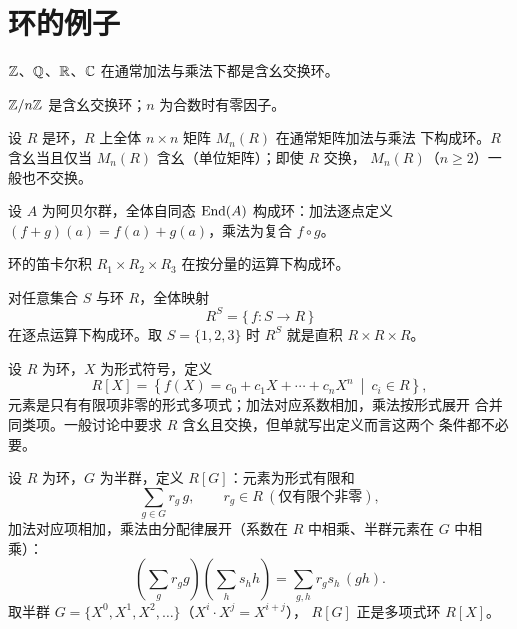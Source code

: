 \section{环的例子}\label{sec:ring-examples}

\begin{example}[数环]
$\mathbb{Z}$、$\mathbb{Q}$、$\mathbb{R}$、$\mathbb{C}$ 在通常加法与乘法下都是含幺交换环。
\end{example}

\begin{example}[模 $n$ 剩余类环]
$\mathbb{Z}/n\mathbb{Z}$ 是含幺交换环；$n$ 为合数时有零因子。
\end{example}

\begin{example}[矩阵环]
设 $R$ 是环，$R$ 上全体 $n\times n$ 矩阵 $M_n(R)$ 在通常矩阵加法与乘法
下构成环。$R$ 含幺当且仅当 $M_n(R)$ 含幺（单位矩阵）；即使 $R$ 交换，
$M_n(R)$（$n\ge 2$）一般也不交换。
\end{example}

\begin{example}[自同态环]
设 $A$ 为阿贝尔群，全体自同态 $\mathrm{End}(A)$ 构成环：加法逐点定义
$(f+g)(a) = f(a)+g(a)$，乘法为复合 $f\circ g$。
\end{example}

\begin{example}[直积]
环的笛卡尔积 $R_1\times R_2\times R_3$ 在按分量的运算下构成环。
\end{example}

\begin{example}[函数环]
对任意集合 $S$ 与环 $R$，全体映射
\[
  R^S = \{\,f\colon S\to R\,\}
\]
在逐点运算下构成环。取 $S = \{1,2,3\}$ 时 $R^S$ 就是直积
$R\times R\times R$。
\end{example}

\begin{example}[多项式环]
设 $R$ 为环，$X$ 为形式符号，定义
\[
  R[X] = \left\{ f(X) = c_0 + c_1 X + \cdots + c_n X^n
    \ \middle|\ c_i\in R \right\},
\]
元素是只有有限项非零的形式多项式；加法对应系数相加，乘法按形式展开
合并同类项。一般讨论中要求 $R$ 含幺且交换，但单就写出定义而言这两个
条件都不必要。
\end{example}

\begin{example}[群环 / 半群环]
设 $R$ 为环，$G$ 为半群，定义 $R[G]$：元素为形式有限和
\[
  \sum_{g\in G} r_g\, g, \qquad r_g\in R\ (\text{仅有限个非零}),
\]
加法对应项相加，乘法由分配律展开（系数在 $R$ 中相乘、半群元素在 $G$
中相乘）：
\[
  \left(\sum_g r_g g\right)\left(\sum_h s_h h\right)
  = \sum_{g,h} r_g s_h\, (gh).
\]
取半群 $G = \{X^0, X^1, X^2, \dots\}$（$X^i\cdot X^j = X^{i+j}$），
$R[G]$ 正是多项式环 $R[X]$。
\end{example}

